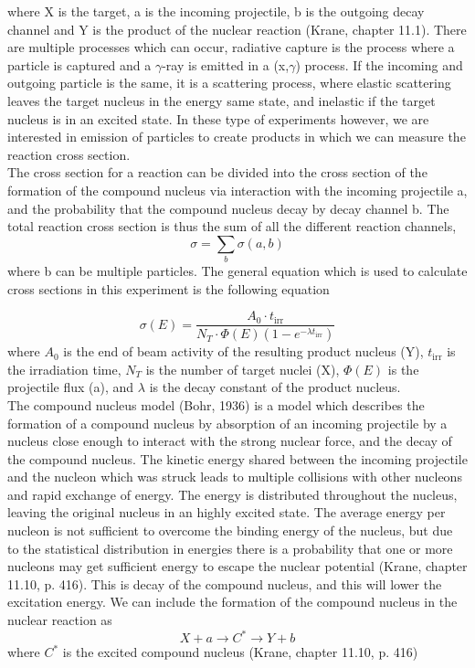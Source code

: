 \documentclass[a4paper,11pt,twoside]{book}
\begin{document}
\noindent where X is the target, a is the incoming projectile, b is the outgoing decay channel and Y is the product of the nuclear reaction (Krane, chapter 11.1). There are multiple processes which can occur, radiative capture is the process where a particle is captured and a $\gamma$-ray is emitted in a (x,$\gamma$) process. If the incoming and outgoing particle is the same, it is a scattering process, where elastic scattering leaves the target nucleus in the energy same state, and inelastic if the target nucleus is in an excited state. In these type of experiments however, we are interested in emission of particles to create products in which we can measure the reaction cross section. \\

\noindent 
The cross section for a reaction can be divided into the cross section of the formation of the compound nucleus via interaction with the incoming projectile a, and the probability that the compound nucleus decay by decay channel b. The total reaction cross section is thus the sum of all the different reaction channels, 
\begin{equation}
    \sigma = \sum_b \sigma(a,b)
\end{equation}
where b can be multiple particles. The general equation which is used to calculate cross sections in this experiment is the following equation

\begin{equation}
    \sigma(E) = \frac{A_0 \cdot t_\text{irr}}{N_T \cdot \Phi(E)(1-e^{-\lambda t_\text{irr}})}
\end{equation}
\noindent where $A_0$ is the end of beam activity of the resulting product nucleus (Y), $t_\text{irr}$ is the irradiation time, $N_T$ is the number of target nuclei (X), $\Phi(E)$ is the projectile flux (a), and $\lambda$ is the decay constant of the product nucleus. \\ 

\noindent The compound nucleus model (Bohr, 1936) is a model which describes the formation of a compound nucleus by absorption of an incoming projectile by a nucleus close enough to interact with the strong nuclear force, and the decay of the compound nucleus. The kinetic energy shared between the incoming projectile and the nucleon which was struck leads to multiple collisions with other nucleons and rapid exchange of energy. The energy is distributed throughout the nucleus, leaving the original nucleus in an highly excited state. The average energy per nucleon is not sufficient to overcome the binding energy of the nucleus, but due to the statistical distribution in energies there is a probability that one or more nucleons may get sufficient energy to escape the nuclear potential (Krane, chapter 11.10, p. 416). This is decay of the compound nucleus, and this will lower the excitation energy. We can include the formation of the compound nucleus in the nuclear reaction as \begin{equation}
    X + a \rightarrow C^* \rightarrow Y + b
\end{equation} where $C^*$ is the excited compound nucleus (Krane, chapter 11.10, p. 416)  \\
\end{document}
